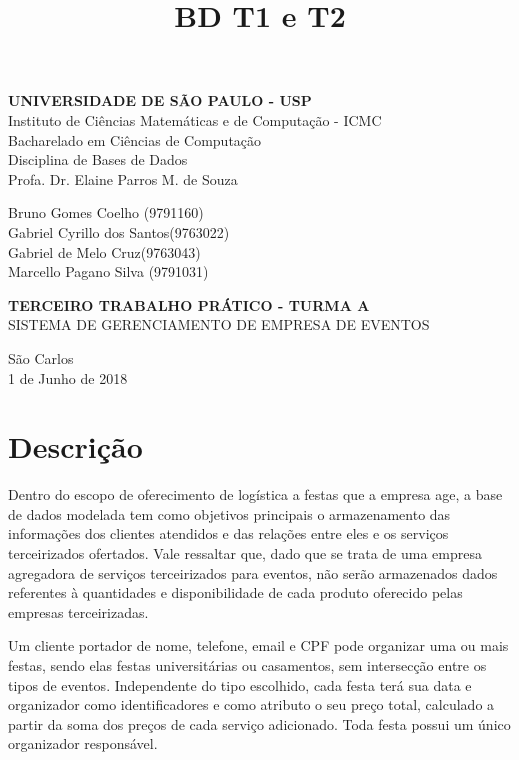\documentclass[12pt,a4paper]{article}
\title{BD T1 e T2}
\begin{document}
{ 
\begin{titlepage}
\begin{center}
\textbf{UNIVERSIDADE DE SÃO PAULO - USP}\\
Instituto de Ciências Matemáticas e de Computação - ICMC\\
Bacharelado em Ciências de Computação\\
Disciplina de Bases de Dados\\
Profa. Dr. Elaine Parros M. de Souza\\
\vspace*{2\baselineskip}

Bruno Gomes Coelho \quad (9791160)\\
Gabriel Cyrillo dos Santos\quad (9763022)\\
Gabriel de Melo Cruz\quad (9763043)\\
Marcello Pagano Silva \quad (9791031)\\

\vspace*{5\baselineskip}

\textbf{TERCEIRO TRABALHO PRÁTICO - TURMA A}\\
SISTEMA DE GERENCIAMENTO DE EMPRESA DE EVENTOS\\
\vfill

São Carlos\\
1 de Junho de 2018
\end{center}
\end{titlepage}
}
\section{Descrição} \label{sec:descricao}

	Dentro do escopo de oferecimento de logística a festas que a empresa age, a base de dados modelada tem como objetivos principais o armazenamento das informações dos clientes atendidos e das relações entre eles e os serviços terceirizados ofertados. Vale ressaltar que, dado que se trata de uma empresa agregadora de serviços terceirizados para eventos, não serão armazenados dados referentes à quantidades e disponibilidade de cada produto oferecido pelas empresas terceirizadas.

	Um cliente portador de nome, telefone, email e CPF pode organizar uma ou mais festas, sendo elas festas universitárias ou casamentos, sem intersecção entre os tipos de eventos. Independente do tipo escolhido, cada festa terá sua data e organizador como identificadores e como atributo o seu preço total, calculado a partir da soma dos preços de cada serviço adicionado. Toda festa possui um único organizador responsável.
\end{document}
